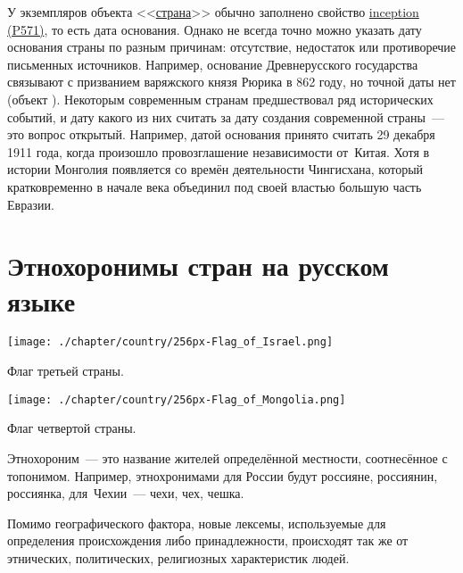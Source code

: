 У экземпляров объекта <<\href{https://www.wikidata.org/wiki/Q6256}{страна}>> обычно заполнено свойство \href{https://www.wikidata.org/wiki/Property:P571}{inception (P571)}, то есть дата основания. Однако не всегда точно можно  указать дату основания страны по разным причинам: отсутствие, недостаток или противоречие письменных источников. Например, основание Древнерусского государства связывают с призванием варяжского князя Рюрика в 862 году, но точной даты нет (объект ). 
Некоторым современным странам предшествовал ряд исторических событий, 
и дату какого из них считать за дату создания современной страны~--- это вопрос открытый. 
Например, датой основания  принято считать 29 декабря 1911 года, 
когда произошло провозглашение независимости от~Китая. 
Хотя в истории Монголия появляется со времён деятельности Чингисхана, 
который кратковременно в начале \MakeUppercase{} века объединил под своей властью большую часть Евразии.



\section{Этнохоронимы стран на русском языке}

\begin{marginfigure}[0.0cm]
    \centering
    \texttt{[image: ./chapter/country/256px-Flag\_of\_Israel.png]}
	\caption{Флаг третьей страны.}%
	\label{fig:flag_israel}%
\end{marginfigure}
\begin{marginfigure}[0.0cm]
    \centering
		\texttt{[image: ./chapter/country/256px-Flag\_of\_Mongolia.png]}
	\caption{Флаг четвертой страны.}%
	\label{fig:flag_mongolia}%
\end{marginfigure}

Этнохороним~--- это название жителей определённой местности, соотнесённое с топонимом. 
Например, этнохронимами для России будут россияне, россиянин, россиянка, 
для~Чехии~--- чехи, чех, чешка.

Помимо географического фактора, новые лексемы, используемые для определения происхождения либо принадлежности, происходят так же от этнических, политических, религиозных характеристик людей\autocite{Zhuravleva2012}. 

